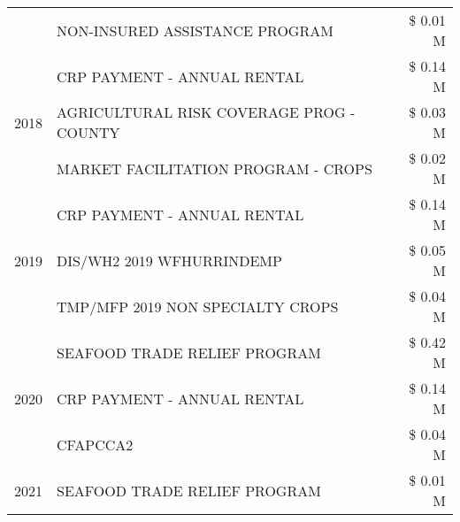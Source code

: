\begin{tabular}{llr}
 & NON-INSURED ASSISTANCE PROGRAM & \$ 0.01 M \\
\cline{1-3}
\multirow[t]{3}{*}{2018} & CRP PAYMENT - ANNUAL RENTAL & \$ 0.14 M \\
 & AGRICULTURAL RISK COVERAGE PROG - COUNTY & \$ 0.03 M \\
 & MARKET FACILITATION PROGRAM - CROPS & \$ 0.02 M \\
\cline{1-3}
\multirow[t]{3}{*}{2019} & CRP PAYMENT - ANNUAL RENTAL & \$ 0.14 M \\
 & DIS/WH2 2019 WFHURRINDEMP & \$ 0.05 M \\
 & TMP/MFP 2019 NON SPECIALTY CROPS & \$ 0.04 M \\
\cline{1-3}
\multirow[t]{3}{*}{2020} & SEAFOOD TRADE RELIEF PROGRAM & \$ 0.42 M \\
 & CRP PAYMENT - ANNUAL RENTAL & \$ 0.14 M \\
 & CFAPCCA2 & \$ 0.04 M \\
\cline{1-3}
2021 & SEAFOOD TRADE RELIEF PROGRAM & \$ 0.01 M \\
\cline{1-3}
\bottomrule
\end{tabular}
